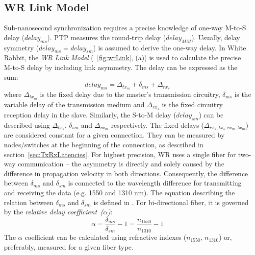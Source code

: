 
\subsection{WR Link  Model}
\label{sec:wrLinkModel}
Sub-nanosecond synchronization requires a precise knowledge of one-way 
M-to-S delay ($ delay_{ms}$). PTP measures 
the round-trip delay ($delay_{MM}$). Usually, delay symmetry 
($delay_{ms}=delay_{sm}$) is assumed to derive the one-way delay. In
White Rabbit, the \textit{WR Link  Model} (\figurename~\ref{fig:wrLink}, (a)) 
is used to calculate the precise M-to-S delay by including link asymmetry. 
The delay can be expressed as the sum:
\begin{equation}
  \label{eq:delayms}
  delay_{ms} = \Delta_{tx_m} + \delta_{ms} + \Delta_{rx_s}
\end{equation}
where $\Delta_{tx_m}$ is the fixed delay due to the master's
transmission circuitry, $\delta_{ms}$ is the variable delay of the
transmission medium and $\Delta_{rx_s}$ is the fixed circuitry
reception delay in the slave. Similarly, the S-to-M
delay ($ delay_{sm}$) can be described using $\Delta_{tx_s}$,
$\delta_{sm}$ and $\Delta_{rx_m}$ respectively. The fixed delays
($\Delta_{rx_s,tx_s,rx_m,tx_m}$) are considered constant for a given
connection. They can be measured by nodes/switches at the beginning of 
the connection, as described in section~\ref{sec:TxRxLatencies}. For
highest precision, WR uses a single fiber for two-way
communication -- the asymmetry is directly and solely caused
by the difference in propagation velocity in both directions. Consequently, the
difference between $\delta_{ms}$ and $\delta_{sm}$ is connected to the
wavelength difference for transmitting and receiving the data
(e.g. 1550 and 1310 nm). The equation describing the relation between
$\delta_{ms}$ and $\delta_{sm}$ is defined in \cite{biblio:WRPTP}.
For bi-directional fiber, it is governed by the 
\textit{relative delay coefficient~($\alpha$)}:
\begin{equation}
  \label{eq:alpha}
  \alpha = \frac{\delta_{ms}}{\delta_{sm}}-1 = \frac{n_{1550}}{n_{1310}}-1
\end{equation}
The $\alpha$ coefficient can be calculated using refractive indexes
($n_{1550}$, $n_{1310}$) or, preferably, measured for a given fiber type. 


